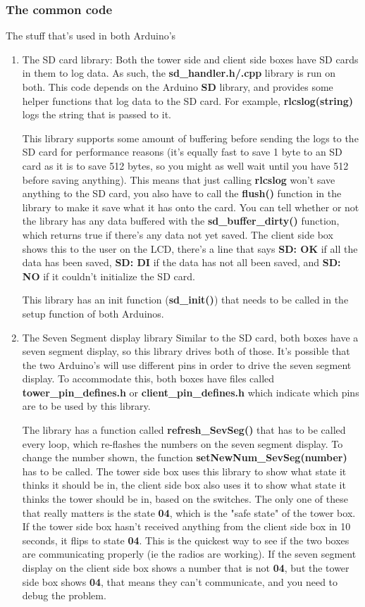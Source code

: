 \documentclass[11pt]{article}
\begin{document}
\subsubsection{The common code}
\label{sec:org9fbc1f9}
The stuff that's used in both Arduino's
\begin{enumerate}
\item The SD card library:
\label{sec:orgd37c3df}
Both the tower side and client side boxes have SD cards in them to log data. As
such, the \textbf{sd\_handler.h/.cpp} library is run on both. This code depends on the
Arduino \textbf{SD} library, and provides some helper functions that log data to the SD
card. For example, \textbf{rlcslog(string)} logs the string that is passed to it.

This library supports some amount of buffering before sending the logs to the SD
card for performance reasons (it's equally fast to save 1 byte to an SD card as
it is to save 512 bytes, so you might as well wait until you have 512 before
saving anything). This means that just calling \textbf{rlcslog} won't save anything to
the SD card, you also have to call the \textbf{flush()} function in the library to make
it save what it has onto the card. You can tell whether or not the library has
any data buffered with the \textbf{sd\_buffer\_dirty()} function, which returns true if
there's any data not yet saved. The client side box shows this to the user on
the LCD, there's a line that says \textbf{SD: OK} if all the data has been saved, \textbf{SD:
DI} if the data has not all been saved, and \textbf{SD: NO} if it couldn't initialize
the SD card.

This library has an init function (\textbf{sd\_init()}) that needs to be called in the
setup function of both Arduinos.

\item The Seven Segment display library
\label{sec:org5949596}
Similar to the SD card, both boxes have a seven segment display, so this library
drives both of those. It's possible that the two Arduino's will use different
pins in order to drive the seven segment display. To accommodate this, both boxes
have files called \textbf{tower\_pin\_defines.h} or \textbf{client\_pin\_defines.h} which indicate
which pins are to be used by this library.

The library has a function called \textbf{refresh\_SevSeg()} that has to be called every
loop, which re-flashes the numbers on the seven segment display. To change the
number shown, the function \textbf{setNewNum\_SevSeg(number)} has to be called. The
tower side box uses this library to show what state it thinks it should be in,
the client side box also uses it to show what state it thinks the tower should
be in, based on the switches. The only one of these that really matters is the
state \textbf{04}, which is the "safe state" of the tower box. If the tower side box
hasn't received anything from the client side box in 10 seconds, it flips to
state \textbf{04}. This is the quickest way to see if the two boxes are communicating
properly (ie the radios are working). If the seven segment display on the client
side box shows a number that is not \textbf{04}, but the tower side box shows \textbf{04},
that means they can't communicate, and you need to debug the problem.


\end{enumerate}
\end{document}
